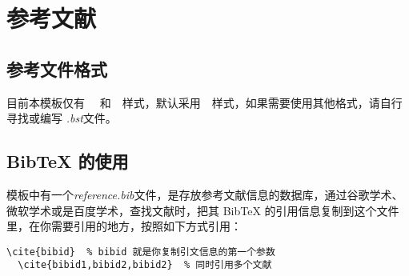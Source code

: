 \chapter{参考文献}

\section{参考文件格式}
目前本模板仅有 ~{\color{blue}{GB/T~7714-2005}}~和~{\color{blue}{GB/T~7714-2015}}~样式，默认采用~{\color{blue}{GB/T~7714-2015}}~样式，如果需要使用其他格式，请自行寻找或编写 \emph{.bst}文件。

\section{BibTeX 的使用}
模板中有一个\emph{reference.bib}文件，是存放参考文献信息的数据库，通过谷歌学术、微软学术或是百度学术，查找文献时，把其 BibTeX 的引用信息复制到这个文件里，在你需要引用的地方，按照如下方式引用：
\begin{lstlisting}[caption=BibTeX 引用参考文献]
  \cite{bibid}  % bibid 就是你复制引文信息的第一个参数
  \cite{bibid1,bibid2,bibid2}  % 同时引用多个文献
\end{lstlisting}